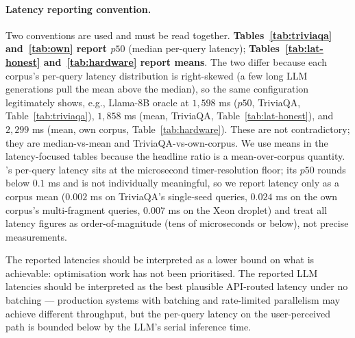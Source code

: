 \paragraph{Latency reporting convention.} Two conventions are
used and must be read together. \textbf{Tables~\ref{tab:triviaqa}
and~\ref{tab:own} report $p50$} (median per-query latency);
\textbf{Tables~\ref{tab:lat-honest} and~\ref{tab:hardware} report
means}. The two differ because each corpus's per-query latency
distribution is right-skewed (a few long LLM generations pull the
mean above the median), so the same configuration legitimately
shows, e.g., Llama-8B oracle at $1{,}598$ ms ($p50$, TriviaQA,
Table~\ref{tab:triviaqa}), $1{,}858$ ms (mean, TriviaQA,
Table~\ref{tab:lat-honest}), and $2{,}299$ ms (mean, own corpus,
Table~\ref{tab:hardware}). These are not contradictory; they are
median-vs-mean and TriviaQA-vs-own-corpus. We use means in the
latency-focused tables because the headline ratio is a
mean-over-corpus quantity. \hyphae{}'s per-query latency sits at
the microsecond timer-resolution floor; its $p50$ rounds below
$0.1$ ms and is not individually meaningful, so we report
\hyphae{} latency only as a corpus mean ($0.002$ ms on TriviaQA's
single-seed queries, $0.024$ ms on the own corpus's
multi-fragment queries, $0.007$ ms on the Xeon droplet) and treat
all \hyphae{} latency figures as order-of-magnitude (tens of
microseconds or below), not precise measurements.

The reported \hyphae{} latencies should be interpreted as a
lower bound on what is achievable: optimisation work has not
been prioritised. The reported LLM latencies should be
interpreted as the best plausible API-routed latency under no
batching --- production systems with batching and rate-limited
parallelism may achieve different throughput, but the per-query
latency on the user-perceived path is bounded below by the
LLM's serial inference time.
